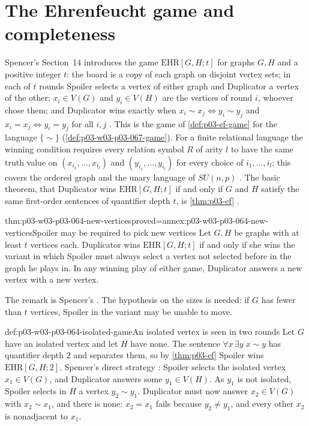 \section{The Ehrenfeucht game and completeness}
\label{sec:p03-w03-p03-064-game}

Spencer's Section~14 introduces the game \(\mathrm{EHR}[G,H;t]\) for graphs
\(G,H\) and a positive integer \(t\): the board is a copy of each graph on
disjoint vertex sets; in each of \(t\) rounds Spoiler selects a vertex of
either graph and Duplicator a vertex of the other; \(x_i\in V(G)\) and
\(y_i\in V(H)\) are the vertices of round \(i\), whoever chose them; and
Duplicator wins exactly when \(x_i\sim x_j\iff y_i\sim y_j\) and
\(x_i=x_j\iff y_i=y_j\) for all \(i,j\)
\cite[p.~26]{Spencer2007LogicRandomStructuresAuthor}.  This is the game of
\cref{def:p03-ef-game} for the language \(\{\sim\}\)
(\cref{def:p03-w03-p03-067-game}).  For a finite relational language the
winning condition requires every relation symbol \(R\) of arity \(l\) to
have the same truth value on \((x_{i_1},\ldots,x_{i_l})\) and
\((y_{i_1},\ldots,y_{i_l})\) for every choice of \(i_1,\ldots,i_l\); this
covers the ordered graph and the unary language of \(SU(n,p)\)
\cite[p.~27]{Spencer2007LogicRandomStructuresAuthor}.  The basic theorem,
that Duplicator wins \(\mathrm{EHR}[G,H;t]\) if and only if \(G\) and \(H\)
satisfy the same first-order sentences of quantifier depth \(t\), is
\cref{thm:p03-ef} \cite[pp.~26--27]{Spencer2007LogicRandomStructuresAuthor}.

\begin{hblemma}{thm:p03-w03-p03-064-new-vertices}{proved=annex:p03-w03-p03-064-new-vertices}{Spoiler may be required to pick new vertices}
Let \(G,H\) be graphs with at least \(t\) vertices each.  Duplicator wins
\(\mathrm{EHR}[G,H;t]\) if and only if she wins the variant in which Spoiler
must always select a vertex not selected before in the graph he plays in.
In any winning play of either game, Duplicator answers a new vertex with a
new vertex.
\end{hblemma}

The remark is Spencer's \cite[p.~26]{Spencer2007LogicRandomStructuresAuthor}.
The hypothesis on the sizes is needed: if \(G\) has fewer than \(t\)
vertices, Spoiler in the variant may be unable to move.

\begin{hbexample}{def:p03-w03-p03-064-isolated-game}{An isolated vertex is seen in two rounds}
Let \(G\) have an isolated vertex and let \(H\) have none.  The sentence
\(\forall x\,\exists y\;x\sim y\) has quantifier depth \(2\) and separates
them, so by \cref{thm:p03-ef} Spoiler wins \(\mathrm{EHR}[G,H;2]\).
Spencer's direct strategy \cite[p.~27]{Spencer2007LogicRandomStructuresAuthor}:
Spoiler selects the isolated vertex \(x_1\in V(G)\), and Duplicator answers
some \(y_1\in V(H)\).  As \(y_1\) is not isolated, Spoiler selects in \(H\) a
vertex \(y_2\sim y_1\).  Duplicator must now answer \(x_2\in V(G)\) with
\(x_2\sim x_1\), and there is none: \(x_2=x_1\) fails because \(y_2\neq y_1\),
and every other \(x_2\) is nonadjacent to \(x_1\).
\end{hbexample}

